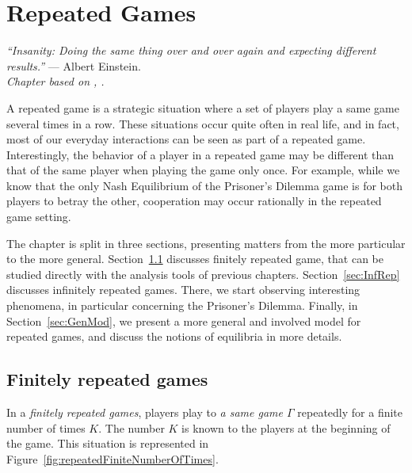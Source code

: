 \ifx \globalmark \undefined %
	
\else
\fi



\chapter{Repeated Games}
{\large{\itshape
``Insanity: Doing the same thing over and over again and expecting different results.''} --- Albert Einstein.\\
}
\label{chap:Rep}
{\small{\itshape
Chapter based on \cite[pages 308 - 331]{MyGTAO}, \cite[Section 6.1]{ShLeMSAG}.}\\
}

A repeated game is a strategic situation where a set of players play a same
game several times in a row. These situations occur quite often in real life,
and in fact, most of our everyday interactions can be seen as part of a
repeated game.\\
Interestingly, the behavior of a player in a repeated game may be different
than that of the same player when playing the game only once. For example,
while we know that the only Nash Equilibrium of the Prisoner's Dilemma game
is for both players to betray the other, cooperation may occur rationally
in the repeated game setting.

The chapter is split in three sections, presenting matters from the more
particular to the more general. Section~\ref{sec:FinRep} discusses finitely
repeated game, that can be studied directly with the analysis tools of
previous chapters. Section~\ref{sec:InfRep} discusses infinitely repeated
games. There, we start observing interesting phenomena, in particular
concerning the Prisoner's Dilemma. Finally, in Section~\ref{sec:GenMod}, we
present a more general and involved model for repeated games, and discuss
the notions of equilibria in more details.

\section{Finitely repeated games}
\label{sec:FinRep}
In a \emph{finitely repeated games}, players play to \emph{a same game
$\Gamma$} repeatedly for a finite number of times $K$. The number $K$ is
known to the players at the beginning of the game. This situation is
represented in Figure~\ref{fig:repeatedFiniteNumberOfTimes}.

